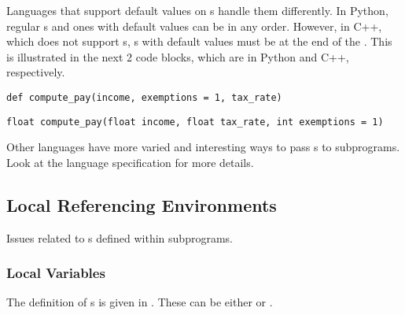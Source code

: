 Languages that support default values on s handle them differently.
In Python, regular s and ones with default values can be in any order.
However, in C++, which does not support s, s with default values must be at the end of the .
This is illustrated in the next 2 code blocks, which are in Python and C++, respectively.
\begin{verbatim}
def compute_pay(income, exemptions = 1, tax_rate)
\end{verbatim}

\begin{verbatim}
float compute_pay(float income, float tax_rate, int exemptions = 1)
\end{verbatim}

Other languages have more varied and interesting ways to pass s to subprograms.
Look at the language specification for more details.

\subsection{Local Referencing Environments}\label{subsec:Local_Referencing_Environments}
Issues related to s defined within subprograms.

\subsubsection{Local Variables}\label{subsubsec:Local_Variables}
The definition of s is given in .
These can be either  or .

